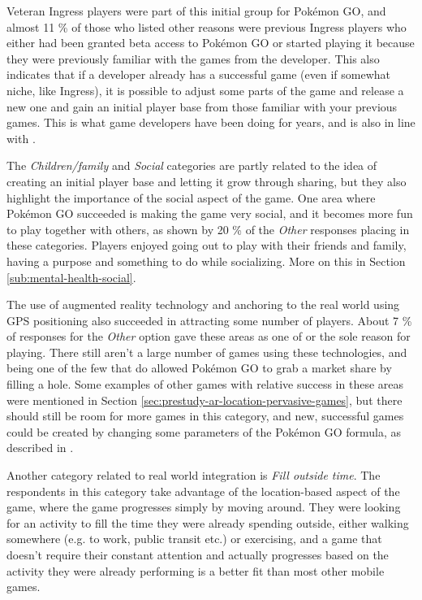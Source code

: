 Veteran Ingress players were part of this initial group for Pokémon GO, and almost 11 \% of those who listed other reasons were previous Ingress players who either had been granted beta access to Pokémon GO or started playing it because they were previously familiar with the games from the developer. This also indicates that if a developer already has a successful game (even if somewhat niche, like Ingress), it is possible to adjust some parts of the game and release a new one and gain an initial player base from those familiar with your previous games. This is what game developers have been doing for years, and is also in line with .

The \emph{Children/family} and \emph{Social} categories are partly related to the idea of creating an initial player base and letting it grow through sharing, but they also highlight the importance of the social aspect of the game. One area where Pokémon GO succeeded is making the game very social, and it becomes more fun to play together with others, as shown by 20 \% of the \emph{Other} responses placing in these categories. Players enjoyed going out to play with their friends and family, having a purpose and something to do while socializing. More on this in Section \ref{sub:mental-health-social}. 

The use of augmented reality technology and anchoring to the real world using GPS positioning also succeeded in attracting some number of players. About 7 \% of responses for the \emph{Other} option gave these areas as one of or the sole reason for playing. There still aren't a large number of games using these technologies, and being one of the few that do allowed Pokémon GO to grab a market share by filling a hole. Some examples of other games with relative success in these areas were mentioned in Section \ref{sec:prestudy-ar-location-pervasive-games}, but there should still be room for more games in this category, and new, successful games could be created by changing some parameters of the Pokémon GO formula, as described in .

Another category related to real world integration is \emph{Fill outside time}. The respondents in this category take advantage of the location-based aspect of the game, where the game progresses simply by moving around. They were looking for an activity to fill the time they were already spending outside, either walking somewhere (e.g. to work, public transit etc.) or exercising, and a game that doesn't require their constant attention and actually progresses based on the activity they were already performing is a better fit than most other mobile games.

